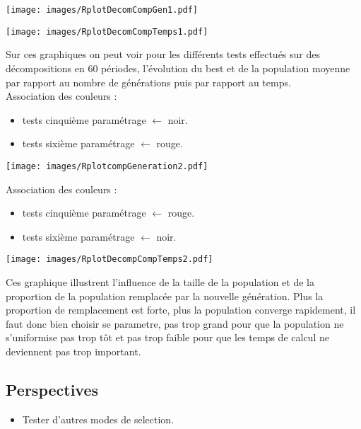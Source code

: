 \documentclass[a4paper]{report}
\begin{document}
\begin{center}
  \texttt{[image: images/RplotDecomCompGen1.pdf]}
\end{center}
\begin{center} 
  \texttt{[image: images/RplotDecomCompTemps1.pdf]}
\end{center}
Sur ces graphiques on peut voir pour les différents tests effectués sur des décompositions en 60 périodes, l'évolution du best et de la population moyenne par rapport au nombre de générations puis par rapport au temps.\\
Association des couleurs :\\
\begin{itemize}
  \item tests cinquième paramétrage $\leftarrow $ noir.\\
  \item tests sixième paramétrage $\leftarrow $ rouge.\\
 
\end{itemize}
\begin{center}
  \texttt{[image: images/RplotcompGeneration2.pdf]}
\end{center}
Association des couleurs :\\
\begin{itemize}
  \item tests cinquième paramétrage $\leftarrow $ rouge.\\
  \item tests sixième paramétrage $\leftarrow $ noir.\\
 
\end{itemize}
\begin{center}
  \texttt{[image: images/RplotDecompCompTemps2.pdf]}
\end{center}
Ces graphique illustrent l'influence de la taille de la population et de la proportion de la population remplacée par la nouvelle génération. Plus la proportion de remplacement est forte, plus la population  converge rapidement, il faut donc bien choisir se parametre, pas trop grand pour que la population ne s'uniformise pas trop tôt et pas trop faible pour que les temps de calcul ne deviennent pas trop important.
\subsection{Perspectives}
\begin{itemize}
\item Tester d'autres modes de selection.


\end{itemize}
\end{document}
